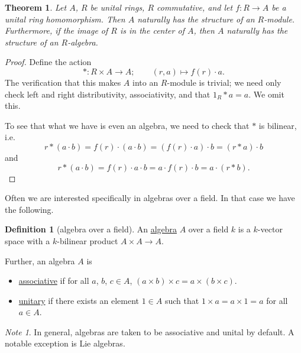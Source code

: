\documentclass[a4paper]{report}
\newcommand{\defn}[1]{\ul{#1}}
\theoremstyle{definition}
\newtheorem{definition}{Definition}[section]
\theoremstyle{plain}
\newtheorem{theorem}{Theorem}[section]
\theoremstyle{remark}
\newtheorem{note}{Note}[section]
\begin{document}
\begin{theorem}
  \label{thm:ringhomomorphisminducesalgebra}
  Let $A$, $R$ be unital rings, $R$ commutative, and let $f\colon R \to A$ be a unital ring homomorphism. Then $A$ naturally has the structure of an $R$-module. Furthermore, if the image of $R$ is in the center of $A$, then $A$ naturally has the structure of an $R$-algebra.
\end{theorem}
\begin{proof}
  Define the action
  \begin{equation*}
    *\colon R \times A \to A;\qquad (r,a) \mapsto f(r)\cdot a.
  \end{equation*}
  The verification that this makes $A$ into an $R$-module is trivial; we need only check left and right distributivity, associativity, and that $1_{R}*a = a$. We omit this.

  To see that what we have is even an algebra, we need to check that $*$ is bilinear, i.e.
  \begin{equation*}
    r*(a\cdot b) = f(r)\cdot (a\cdot b) = (f(r)\cdot a)\cdot b = (r*a)\cdot b
  \end{equation*}
  and
  \begin{equation*}
    r*(a\cdot b) = f(r)\cdot a \cdot b = a \cdot f(r) \cdot b = a\cdot (r*b).
  \end{equation*}
\end{proof}

Often we are interested specifically in algebras over a field. In that case we have the following.
\begin{definition}[algebra over a field]
  \label{def:algebraoverafield}
  An \defn{algebra} $A$ over a field $k$ is a $k$-vector space with a $k$-bilinear product $A \times A \to A$.

  Further, an algebra $A$ is
  \begin{itemize}
    \item \defn{associative} if for all $a$, $b$, $c \in A$, $(a \times b) \times c = a \times (b \times c)$.

    \item \defn{unitary} if there exists an element $1 \in A$ such that $1 \times a = a \times 1 = a$ for all $a \in A$.
  \end{itemize}
\end{definition}

\begin{note}
  In general, algebras are taken to be associative and unital by default. A notable exception is Lie algebras.
\end{note}
\end{document}
